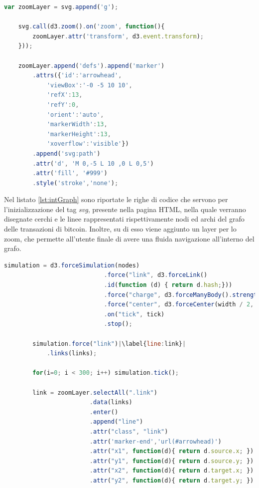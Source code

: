 \begin{itemize}
\begin{lstlisting}[language=Javascript, label=lst:intGraph, caption={Inizializzazione svg per il grafo.}]
    var zoomLayer = svg.append('g');

    svg.call(d3.zoom().on('zoom', function(){
        zoomLayer.attr('transform', d3.event.transform);
    }));

    zoomLayer.append('defs').append('marker')
        .attrs({'id':'arrowhead',
            'viewBox':'-0 -5 10 10',
            'refX':13,
            'refY':0,
            'orient':'auto',
            'markerWidth':13,
            'markerHeight':13,
            'xoverflow':'visible'})
        .append('svg:path')
        .attr('d', 'M 0,-5 L 10 ,0 L 0,5')
        .attr('fill', '#999')
        .style('stroke','none');
\end{lstlisting}

Nel listato \ref{lst:intGraph} sono riportate le righe di codice che servono per l'inizializzazione del tag \textit{svg}, presente nella pagina HTML, nella quale verranno disegnate cerchi e le linee rappresentati rispettivamente nodi ed archi del grafo delle transazioni di bitcoin. Inoltre, su di esso viene aggiunto un layer per lo zoom, che permette all'utente finale di avere una fluida navigazione all'interno del grafo.


\begin{lstlisting}[language=Javascript, escapechar=|, label=lst:drawLine, caption={Creazione linee.}]
		simulation = d3.forceSimulation(nodes)
                            .force("link", d3.forceLink()
                            .id(function (d) { return d.hash;}))
                            .force("charge", d3.forceManyBody().strength(-80))
                            .force("center", d3.forceCenter(width / 2, height / 2))
                            .on("tick", tick)
                            .stop();

        simulation.force("link")|\label{line:link}|
            .links(links);

        for(i=0; i < 300; i++) simulation.tick();

        link = zoomLayer.selectAll(".link")
                        .data(links)
                        .enter()
                        .append("line")
                        .attr("class", "link")
                        .attr('marker-end','url(#arrowhead)')
                        .attr("x1", function(d){ return d.source.x; })
                        .attr("y1", function(d){ return d.source.y; })
                        .attr("x2", function(d){ return d.target.x; })
                        .attr("y2", function(d){ return d.target.y; })



\end{lstlisting}
\end{itemize}

